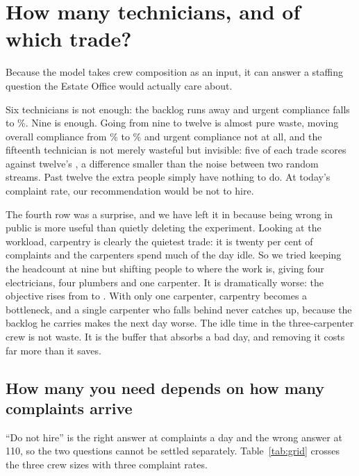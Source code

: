 \documentclass[11pt]{article}
\newcommand{\num}[1]{#1}
\begin{document}
\section{How many technicians, and of which trade?}

Because the model takes crew composition as an input, it can answer a staffing
question the Estate Office would actually care about.

\begin{table}[h]\centering\small

\caption{Different crews, all running the best method on the same complaints.}
\label{tab:crew}
\end{table}

Six technicians is not enough: the backlog runs away and urgent compliance
falls to \NCrewSixUrgent\%. Nine is enough. Going from nine to twelve is
almost pure waste, moving overall compliance from \NCrewNineSla\% to
\NCrewTwelveSla\% and urgent compliance not at all, and the fifteenth
technician is not merely wasteful but invisible: five of each trade scores
\NCrewFifteenObj{} against twelve's \NCrewTwelveObj, a difference smaller
than the noise between two random streams. Past twelve the extra people
simply have nothing to do. At today's complaint rate, our recommendation
would be not to hire.

The fourth row was a surprise, and we have left it in because being wrong in
public is more useful than quietly deleting the experiment. Looking at the
workload, carpentry is clearly the quietest trade: it is twenty per cent of
complaints and the carpenters spend much of the day idle. So we tried keeping
the headcount at nine but shifting people to where the work is, giving four
electricians, four plumbers and one carpenter. It is dramatically worse:
the objective rises from \NCrewNineObj{} to \NCrewRebalObj. With only one
carpenter, carpentry becomes a bottleneck, and a single carpenter who falls
behind never catches up, because the backlog he carries makes the next day
worse. The idle time in the three-carpenter crew is not waste. It is the
buffer that absorbs a bad day, and removing it costs far more than it saves.

\subsection{How many you need depends on how many complaints arrive}

``Do not hire'' is the right answer at \NTicketsPerDay{} complaints a day and
the wrong answer at \num{110}, so the two questions cannot be settled
separately. Table~\ref{tab:grid} crosses the three crew sizes with three
complaint rates.
\end{document}
